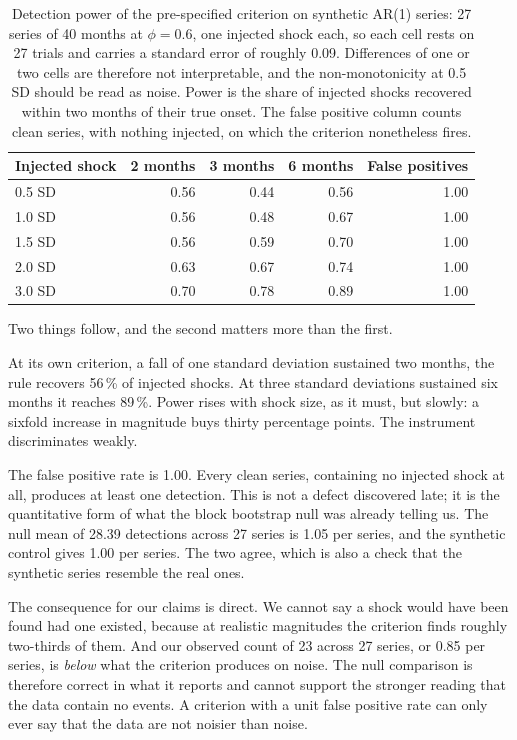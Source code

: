 \documentclass[11pt,a4paper]{article}
\begin{document}
\begin{table}[htbp]
\centering
\caption{Detection power of the pre-specified criterion on synthetic AR(1)
series: 27 series of 40 months at $\phi = 0.6$, one injected shock each, so
each cell rests on 27 trials and carries a standard error of roughly 0.09.
Differences of one or two cells are therefore not interpretable, and the
non-monotonicity at 0.5 SD should be read as noise. Power is the share of
injected shocks recovered within two months of their true onset. The false
positive column counts clean series, with nothing injected, on which the
criterion nonetheless fires.}
\label{tab:poscontrol}
\small
\begin{tabular}{@{}lrrrr@{}}
\toprule
\textbf{Injected shock} & \textbf{2 months} & \textbf{3 months} &
\textbf{6 months} & \textbf{False positives} \\
\midrule
0.5 SD & 0.56 & 0.44 & 0.56 & 1.00 \\
1.0 SD & 0.56 & 0.48 & 0.67 & 1.00 \\
1.5 SD & 0.56 & 0.59 & 0.70 & 1.00 \\
2.0 SD & 0.63 & 0.67 & 0.74 & 1.00 \\
3.0 SD & 0.70 & 0.78 & 0.89 & 1.00 \\
\bottomrule
\end{tabular}
\end{table}

Two things follow, and the second matters more than the first.

At its own criterion, a fall of one standard deviation sustained two months,
the rule recovers 56\,\% of injected shocks. At three standard deviations
sustained six months it reaches 89\,\%. Power rises with shock size, as it
must, but slowly: a sixfold increase in magnitude buys thirty percentage
points. The instrument discriminates weakly.

The false positive rate is 1.00. Every clean series, containing no injected
shock at all, produces at least one detection. This is not a defect discovered
late; it is the quantitative form of what the block bootstrap null was already
telling us. The null mean of 28.39 detections across 27 series is 1.05 per
series, and the synthetic control gives 1.00 per series. The two agree, which
is also a check that the synthetic series resemble the real ones.

The consequence for our claims is direct. We cannot say a shock would have been
found had one existed, because at realistic magnitudes the criterion finds
roughly two-thirds of them. And our observed count of 23 across 27 series, or
0.85 per series, is \emph{below} what the criterion produces on noise. The null
comparison is therefore correct in what it reports and cannot support the
stronger reading that the data contain no events. A criterion with a unit false
positive rate can only ever say that the data are not noisier than noise.
\end{document}
